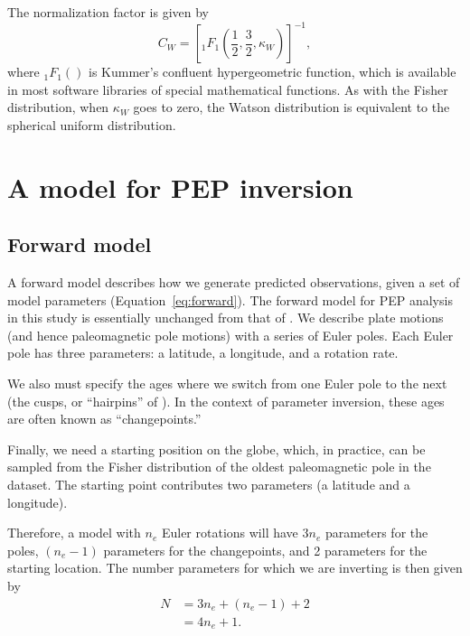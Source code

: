 \documentclass[11pt,letterpaper]{article}
\begin{document}
The normalization factor is given by
\begin{equation}
  C_W = \left[ {}_1 F_1 \left( \frac{1}{2}, \frac{3}{2}, \kappa_W \right) \right]^{-1},
\end{equation}
where ${}_1 F_1()$ is Kummer's confluent hypergeometric function, which is available in most software libraries of special mathematical functions. As with the Fisher distribution, when $\kappa_W$ goes to zero,  the Watson distribution is equivalent to the spherical uniform distribution.

\section*{A model for PEP inversion}
\label{sec:model}
\subsection*{Forward model}
\label{sec:forward_model}
A forward model describes how we generate predicted observations, given a set of model parameters (Equation~\eqref{eq:forward}). The forward model for PEP analysis in this study is essentially unchanged from that of \citet{Gordon1984a}. We describe plate motions (and hence paleomagnetic pole motions) with a series of Euler poles. Each Euler pole has three parameters: a latitude, a longitude, and a rotation rate.

We also must specify the ages where we switch from one Euler pole to the next (the cusps, or ``hairpins'' of \citet{Irving1972a}). In the context of parameter inversion, these ages are often known as ``changepoints.''

Finally, we need a starting position on the globe, which, in practice, can be sampled from the Fisher distribution of the oldest paleomagnetic pole in the dataset. The starting point contributes two parameters (a latitude and a longitude).

Therefore, a model with $n_e$ Euler rotations will have $3 n_e$ parameters for the poles, $(n_e-1)$ parameters for the changepoints,
and 2 parameters for the starting location. The number parameters for which we are inverting is then given by
\begin{equation}
\begin{aligned}
N &= 3 n_e + (n_e -1) + 2 \\
 &= 4 n_e + 1.
\end{aligned}
\label{eq:n_parameters}
\end{equation}
\end{document}
